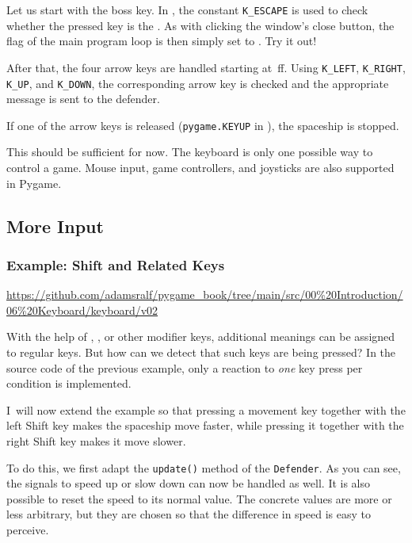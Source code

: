 Let us start with the boss key. In , the constant \texttt{K\_ESCAPE} is used to check whether the pressed key is the \keys{\esc}. As with clicking the window’s close button, the flag of the main program loop is then simply set to \false. Try it out!

After that, the four arrow keys are handled starting at \,ff. Using \texttt{K\_LEFT}, \texttt{K\_RIGHT}, \texttt{K\_UP}, and \texttt{K\_DOWN}, the corresponding arrow key is checked and the appropriate message is sent to the defender.

If one of the arrow keys is released (\texttt{pygame.KEYUP} in ), the spaceship is stopped.

This should be sufficient for now. The keyboard is only one possible way to control a game. Mouse input, game controllers, and joysticks are also supported in Pygame.

\subsection{More Input}
\subsubsection{Example: Shift and Related Keys}
\begin{diskbox}
	\url{https://github.com/adamsralf/pygame_book/tree/main/src/00%20Introduction/06%20Keyboard/keyboard/v02}
\end{diskbox}

With the help of \keys{\shift}, \keys{\ctrl}, or other modifier keys, additional meanings can be assigned to regular keys. But how can we detect that such keys are being pressed? In the source code of the previous example, only a reaction to \emph{one} key press per condition is implemented.

I~will now extend the example so that pressing a movement key together with the left Shift key makes the spaceship move faster, while pressing it together with the right Shift key makes it move slower.

To do this, we first adapt the \texttt{update()} method of the \texttt{Defender}. As you can see, the signals to speed up or slow down can now be handled as well. It is also possible to reset the speed to its normal value. The concrete values are more or less arbitrary, but they are chosen so that the difference in speed is easy to perceive.

